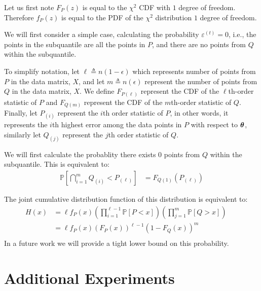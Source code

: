 \documentclass{article} %
\begin{document}
\begin{appendices}
	Let us first note $F_P(z)$ is equal to the $\chi^2$ CDF with $1$ degree of freedom. Therefore $f_P(z)$ is equal to the PDF of the $\chi^2$ distribution $1$ degree of freedom. 
	
	We will first consider a simple case, calculating the probability $\varepsilon^{(t)} = 0$, i.e., the points in the subquantile are all the points in $P$, and there are no points from $Q$ within the subquantile.
	
	To simplify notation, let $\ell \triangleq n(1-\epsilon)$ which represents number of points from $P$ in the data matrix, $X$, and let $m \triangleq n(\epsilon)$ represent the number of points from $Q$ in the data matrix, $X$. We define $F_{P(\ell)}$ represent the CDF of the $\ell$th-order statistic of $P$ and $F_{Q(m)}$ represent the CDF of the $m$th-order statistic of $Q$. Finally, let $P_{(i)}$ represent the $i$th order statistic of $P$, in other words, it represents the $i$th highest error among the data points in $P$ with respect to ${\bm{\theta}}$, similarly let $Q_{(j)}$ represent the $j$th order statistic of $Q$. 
	
	We will first calculate the probablity there exists $0$ points from $Q$ within the subquantile. This is equivalent to:
	\begin{align}
		\mathbb{P}\left[\bigcap_{i=1}^m Q_{(i)} < P_{(\ell)}\right] &= F_{Q(1)}\left(P_{(\ell)}\right)
	\end{align}

	The joint cumulative distribution function of this distribution is equivalent to:
	\begin{align*}
		H(x) &= \ell f_P(x) \left(\prod_{i=1}^{\ell-1} \mathbb{P}\left[P < x\right]\right) \left(\prod_{j=1}^{m}\mathbb{P}\left[Q > x\right]\right) &&\\
		&= \ell f_P(x) \left(F_P(x)\right)^{\ell-1}\left(1 - F_Q(x)\right)^{m} &&\\
	\end{align*}
	In a future work we will provide a tight lower bound on this probability. 
	
	\newpage
	
	\section{Additional Experiments}
	\label{app:additional-experiments}

\end{appendices}
\end{document}
